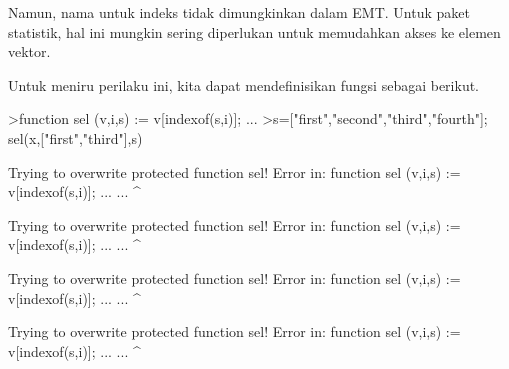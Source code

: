 \documentclass[a4paper,10pt]{article}
\begin{document}
\begin{eulernotebook}
\begin{eulercomment}
\begin{eulercomment}
\begin{eulercomment}
\begin{eulercomment}
\begin{eulercomment}
\begin{eulercomment}
\begin{eulercomment}
\begin{eulercomment}
\begin{eulercomment}
\begin{eulercomment}
\begin{eulercomment}
\begin{eulercomment}
\begin{eulercomment}
\begin{eulercomment}
\begin{eulercomment}
\begin{eulercomment}
\begin{eulercomment}
\begin{eulercomment}
\begin{eulercomment}
\begin{eulercomment}
\begin{eulercomment}
\begin{eulercomment}
\begin{eulercomment}
\begin{eulercomment}
\begin{eulercomment}
\begin{eulercomment}
\begin{eulercomment}
\begin{eulercomment}
\begin{eulercomment}
\begin{eulercomment}
\begin{eulercomment}
\begin{eulercomment}
\begin{eulercomment}
\begin{eulercomment}
\begin{eulerprompt}
\end{eulerprompt}
\begin{euleroutput}
  [-55,  -45,  -45,  -55]
\end{euleroutput}
\begin{eulercomment}
Namun, nama untuk indeks tidak dimungkinkan dalam EMT. Untuk paket
statistik, hal ini mungkin sering diperlukan untuk memudahkan akses ke
elemen vektor.

Untuk meniru perilaku ini, kita dapat mendefinisikan fungsi sebagai
berikut.
\end{eulercomment}
\begin{eulerprompt}
>function sel (v,i,s) := v[indexof(s,i)]; ...
>s=["first","second","third","fourth"]; sel(x,["first","third"],s)
\end{eulerprompt}
\begin{euleroutput}
  
  Trying to overwrite protected function sel!
  Error in:
  function sel (v,i,s) := v[indexof(s,i)]; ... ...
               ^
  
  Trying to overwrite protected function sel!
  Error in:
  function sel (v,i,s) := v[indexof(s,i)]; ... ...
               ^
  
  Trying to overwrite protected function sel!
  Error in:
  function sel (v,i,s) := v[indexof(s,i)]; ... ...
               ^
  
  Trying to overwrite protected function sel!
  Error in:
  function sel (v,i,s) := v[indexof(s,i)]; ... ...
               ^
  

\end{euleroutput}
\end{eulercomment}
\end{eulercomment}
\end{eulercomment}
\end{eulercomment}
\end{eulercomment}
\end{eulercomment}
\end{eulercomment}
\end{eulercomment}
\end{eulercomment}
\end{eulercomment}
\end{eulercomment}
\end{eulercomment}
\end{eulercomment}
\end{eulercomment}
\end{eulercomment}
\end{eulercomment}
\end{eulercomment}
\end{eulercomment}
\end{eulercomment}
\end{eulercomment}
\end{eulercomment}
\end{eulercomment}
\end{eulercomment}
\end{eulercomment}
\end{eulercomment}
\end{eulercomment}
\end{eulercomment}
\end{eulercomment}
\end{eulercomment}
\end{eulercomment}
\end{eulercomment}
\end{eulercomment}
\end{eulercomment}
\end{eulercomment}
\end{eulernotebook}
\end{document}
